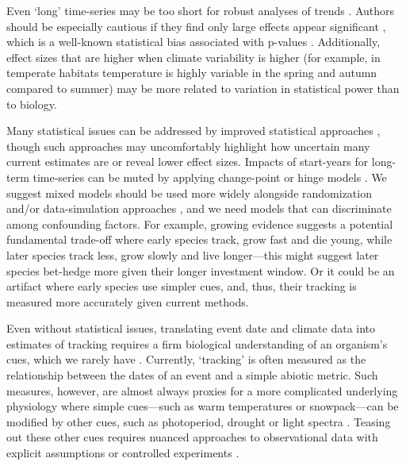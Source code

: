 \documentclass[11pt,letterpaper]{article}
\newcommand{\R}[1]{\label{}\linelabel{#1}} %
\begin{document}
Even `long' time-series may be too short for robust analyses of trends \citep{bolmgren2013}. Authors should be especially cautious if they find only large effects appear significant \citep[e.g.,][]{CaraDonna2014}, which is a well-known statistical bias associated with p-values \citep{loken2017}. Additionally, effect sizes that are higher when climate variability is higher (for example, in temperate habitats temperature is highly variable in the spring and autumn compared to summer) may be more related to variation in statistical power than to biology. 

Many statistical issues can be addressed by improved statistical approaches \citep[e.g.,][]{gienapp2005,pearse2017}, though such approaches may uncomfortably highlight how uncertain many current estimates are \citep{brown2016} or reveal lower effect sizes. Impacts of start-years for long-term time-series can be muted by applying change-point or hinge models \citep[e.g.,][]{kharouba2018}.  We suggest mixed models should be used more widely alongside randomization and/or data-simulation approaches \citep[e.g.,][]{bolmgren2013}, and we need models that can discriminate among confounding factors. For example, growing evidence suggests a potential fundamental trade-off where early species track, grow fast and die young, while later species track less, grow slowly and live longer---this might suggest later species bet-hedge more given their longer investment window. Or it could be an artifact where early species use simpler cues, and, thus, their tracking is measured more accurately given current methods.

Even without statistical issues, translating event date and climate data into estimates of tracking requires a firm biological understanding of an organism's cues, which we rarely have \citep{chmura2019}. Currently, `tracking' is often measured as the relationship between the dates of an event and a simple abiotic metric. Such measures, however, are almost always proxies for a more complicated underlying physiology where simple cues---such as warm temperatures or snowpack---can be modified by other cues, such as photoperiod, drought or light spectra \citep{Bagnall1993,Stinchcombe:2004ec}. Teasing out these other cues requires nuanced approaches to observational data with explicit assumptions \citep{tansey2017}\R{citetansey} or controlled experiments \citep{Wilczek:2009oa,Caffarra:2011qf}. 
\end{document}

